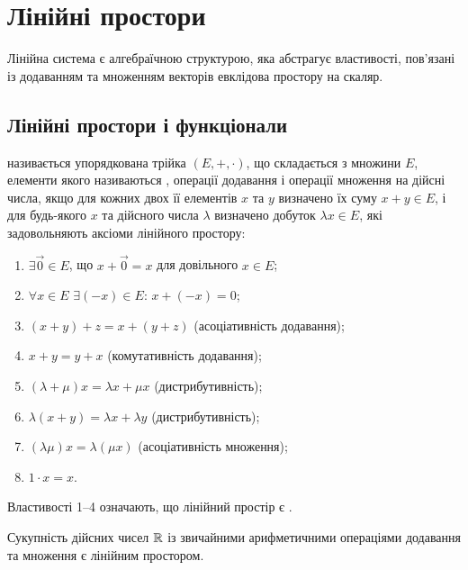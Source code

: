 \chapter{Лінійні простори}

Лінійна система є алгебраїчною структурою, яка абстрагує
властивості, пов’язані із додаванням та множенням векторів
евклідова простору на скаляр.

\section{Лінійні простори і функціонали}

\begin{definition}
називається упорядкована трійка $(E, +, \cdot)$, що складається з
множини $E$, елементи якого називаються ,
операції додавання і операції множення на дійсні числа, якщо
для кожних двох її елементів $x$ та $y$ визначено їх суму
$x + y \in E$, і для будь-якого $x$ та дійсного числа $\lambda$ визначено
добуток $\lambda x \in E$, які задовольняють аксіоми лінійного
простору:
\begin{enumerate}
\item $\exists \vec 0 \in E$, що $x + \vec 0 = x$ для довільного $x \in E$;
\item $\forall x \in E$ $\exists (-x) \in E$: $x + (-x) = 0$;
\item $(x + y) + z = x + (y + z)$ (асоціативність додавання);
\item $x + y = y + x$ (комутативність додавання);
\item $(\lambda + \mu) x = \lambda x + \mu x$ (дистрибутивність);
\item $\lambda (x + y) = \lambda x + \lambda y$ (дистрибутивність);
\item $(\lambda \mu) x = \lambda (\mu x)$ (асоціативність множення);
\item $1 \cdot x = x$.
\end{enumerate}
\end{definition}

\begin{remark}
Властивості 1--4 означають, що лінійний простір є
.
\end{remark}

\begin{example}
Сукупність дійсних чисел $\mathbb{R}$ із звичайними
арифметичними операціями додавання та множення є
лінійним простором.
\end{example}

